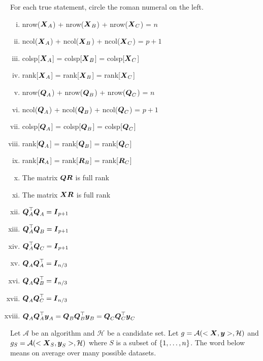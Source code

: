 \documentclass[12pt]{article}
\begin{document}
\begin{enumerate}[(a)]

\vspace{-0.3cm}
 For each true statement, circle the roman numeral on the left. 

\begin{enumerate}[(i)]
\item \iftoggle{solutions}{\inred{TRUE}}{} nrow($\boldsymbol{X}_A$) + nrow($\boldsymbol{X}_B$) + nrow($\boldsymbol{X}_C$) = $n$
\item ncol($\boldsymbol{X}_A$) + ncol($\boldsymbol{X}_B$) + ncol($\boldsymbol{X}_C$) = $p+1$
\item colsp[$\boldsymbol{X}_A$] = colsp[$\boldsymbol{X}_B$] = colsp[$\boldsymbol{X}_C$]
\item \iftoggle{solutions}{\inred{TRUE}}{} rank[$\boldsymbol{X}_A$] = rank[$\boldsymbol{X}_B$] = rank[$\boldsymbol{X}_C$] \pagebreak
\item \iftoggle{solutions}{\inred{TRUE}}{} nrow($\boldsymbol{Q}_A$) + nrow($\boldsymbol{Q}_B$) + nrow($\boldsymbol{Q}_C$) = $n$
\item ncol($\boldsymbol{Q}_A$) + ncol($\boldsymbol{Q}_B$) + ncol($\boldsymbol{Q}_C$) = $p+1$
\item colsp[$\boldsymbol{Q}_A$] = colsp[$\boldsymbol{Q}_B$] = colsp[$\boldsymbol{Q}_C$]
\item \iftoggle{solutions}{\inred{TRUE}}{} rank[$\boldsymbol{Q}_A$] = rank[$\boldsymbol{Q}_B$] = rank[$\boldsymbol{Q}_C$]
\item \iftoggle{solutions}{\inred{TRUE}}{} rank[$\boldsymbol{R}_A$] = rank[$\boldsymbol{R}_B$] = rank[$\boldsymbol{R}_C$]
\item \iftoggle{solutions}{\inred{TRUE}}{} The matrix $\boldsymbol{Q}\boldsymbol{R}$ is full rank
\item \iftoggle{solutions}{\inred{TRUE}}{} The matrix $\boldsymbol{X}\boldsymbol{R}$ is full rank
\item \iftoggle{solutions}{\inred{TRUE}}{} $\boldsymbol{Q}_A^\top \boldsymbol{Q}_A = \boldsymbol{I}_{p+1}$
\item $\boldsymbol{Q}_A^\top \boldsymbol{Q}_B = \boldsymbol{I}_{p+1}$
\item $\boldsymbol{Q}_A^\top \boldsymbol{Q}_C = \boldsymbol{I}_{p+1}$
\item $\boldsymbol{Q}_A \boldsymbol{Q}_A^\top = \boldsymbol{I}_{n/3}$
\item $\boldsymbol{Q}_A \boldsymbol{Q}_B^\top = \boldsymbol{I}_{n/3}$
\item $\boldsymbol{Q}_A \boldsymbol{Q}_C^\top = \boldsymbol{I}_{n/3}$
\item $\boldsymbol{Q}_A \boldsymbol{Q}_A^\top \boldsymbol{y}_A = \boldsymbol{Q}_B \boldsymbol{Q}_B^\top \boldsymbol{y}_B = \boldsymbol{Q}_C \boldsymbol{Q}_C^\top \boldsymbol{y}_C$
\end{enumerate}

Let $\mathcal{A}$ be an algorithm and $\mathcal{H}$ be a candidate set. Let $g = \mathcal{A}(<\boldsymbol{X}, \boldsymbol{y}>, \mathcal{H})$ and $g_S = \mathcal{A}(<\boldsymbol{X}_S, \boldsymbol{y}_S>, \mathcal{H})$ where $S$ is a subset of $\left\{1, \ldots, n\right\}$. The word  below means on average over many possible datasets.


\end{enumerate}
\end{document}
